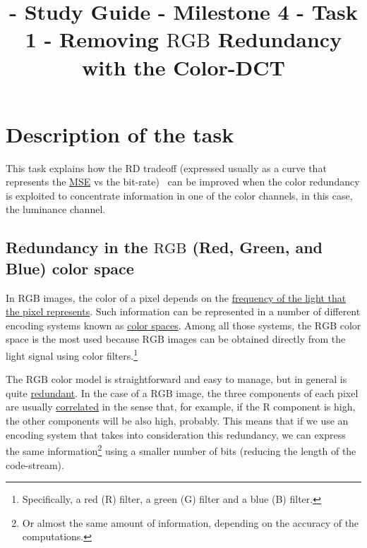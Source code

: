 

\title{\SM{} - Study Guide - Milestone 4 - Task 1 - Removing $\text{RGB}$ Redundancy with the Color-DCT}

\maketitle

\tableofcontents

\section{Description of the task}

This task explains how the RD tradeoff (expressed usually as a curve
that represents the
\href{https://en.wikipedia.org/wiki/Mean_squared_error}{MSE} vs the
bit-rate)~\cite{vruiz__information_theory} can be improved when the
color redundancy is exploited to concentrate information in one of the
color channels, in this case, the luminance channel.

\subsection{Redundancy in the $\text{RGB}$ (Red, Green, and Blue) color space}

In $\text{RGB}$ images, the color of a pixel depends on the
\href{https://en.wikipedia.org/wiki/Visible_spectrum}{frequency of the
  light that the pixel represents}. Such information can be
represented in a number of different encoding systems known as
\href{https://en.wikipedia.org/wiki/Color_space}{color spaces}. Among
all those systems, the $\text{RGB}$ color space is the most used
because $\text{RGB}$ images can be obtained directly from the light
signal using color filters.\footnote{Specifically, a red (R) filter, a
green (G) filter and a blue (B) filter.}

The $\text{RGB}$ color model is straightforward and easy to manage,
but in general is quite
\href{https://en.wikipedia.org/wiki/Data_redundancy}{redundant}.  In
the case of a $\text{RGB}$ image, the three components of each pixel
are usually
\href{https://en.wikipedia.org/wiki/Correlation_and_dependence}{correlated}
in the sense that, for example, if the R component is high, the other
components will be also high, probably. This means that if we use an
encoding system that takes into consideration this redundancy, we can
express the same information\footnote{Or almost the same amount of
information, depending on the accuracy of the computations.} using a
smaller number of bits (reducing the length of the code-stream).

